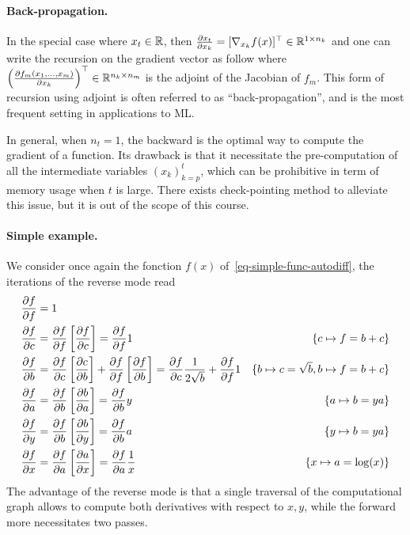 \paragraph{Back-propagation.}

In the special case where $x_t \in \mathbb{R}$, then $\frac{ \partial x_t}{\partial x_k} = [\nabla_{x_k} f(x)]^\top \in \mathbb{R}^{1 \times n_k}$ and one can write the recursion on the gradient vector as follow 
where $\left( \frac{ \partial f_m(x_1,\ldots,x_m)}{\partial x_k} \right)^\top \in \mathbb{R}^{n_k \times n_m}$ is the adjoint of the Jacobian of $f_m$. This form of recursion using adjoint is often referred to as ``back-propagation'', and is the most frequent setting in applications to ML.

In general, when $n_t=1$, the backward is the optimal way to compute the gradient of a function. Its drawback is that it necessitate the pre-computation of all the intermediate variables $(x_k)_{k=p}^t$, which can be prohibitive in term of memory usage when $t$ is large. There exists check-pointing method to alleviate this issue, but it is out of the scope of this course.

\paragraph{Simple example.}

We consider once again the fonction $f(x)$ of~\eqref{eq-simple-func-autodiff}, the iterations of the reverse mode read
\begin{align*}
		\frac{ \partial f}{\partial f} &= 1 &\\
		\frac{ \partial f}{\partial c} &= \frac{ \partial f}{\partial f} \left[\frac{ \partial f}{\partial c}\right] = \frac{ \partial f}{\partial f} 1 &
			\{ c \mapsto f = b+c\}\\
		\frac{ \partial f}{\partial b} &= \frac{ \partial f}{\partial c} \left[\frac{ \partial c}{\partial b}\right] + \frac{ \partial f}{\partial f} \left[\frac{ \partial f}{\partial b}\right] = \frac{ \partial f}{\partial c} \frac{1}{2\sqrt{b}} + \frac{ \partial f}{\partial f} 1 & 
			\{ b \mapsto c=\sqrt{b}, b \mapsto f=b+c\} \\
		\frac{ \partial f}{\partial a} &= \frac{ \partial f}{\partial b} \left[\frac{ \partial b}{\partial a}\right] = \frac{ \partial f}{\partial b} y & 
			\{ a \mapsto b=y a\} \\
		\frac{ \partial f}{\partial y} &= \frac{ \partial f}{\partial b} \left[\frac{ \partial b}{\partial y}\right] = \frac{ \partial f}{\partial b} a & 
			\{ y \mapsto b=ya\} \\
		\frac{ \partial f}{\partial x} &= \frac{ \partial f}{\partial a} \left[\frac{ \partial a}{\partial x}\right] = \frac{ \partial f}{\partial a} \frac{1}{x} & 
			\{ x \mapsto a=\log(x)\}
\end{align*}
The advantage of the reverse mode is that a single traversal of the computational graph allows to compute both derivatives with respect to $x,y$, while the forward more necessitates two passes.

